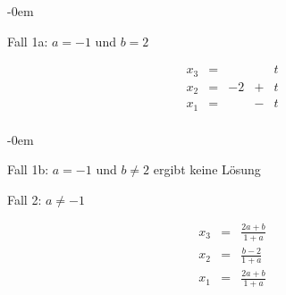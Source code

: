 \begin{enumerate}
						\abovedisplayskip-0em
						
						Fall 1a: \emph{$a = -1$} und \emph{$b = 2$} 
						
						\[
							\begin{array} {ccccc}
								x_3 & = & & & t\\
								x_2 & = & -2 & + & t\\
								x_1 & = & & - & t\\
							\end{array}
						\]
						
						\abovedisplayskip-0em
						
						Fall 1b: \emph{$a = -1$} und \emph{$b \neq 2$} ergibt keine L\"osung
						
						Fall 2: \emph{$a \neq -1$}
						
						\[
							\begin{array} {ccccc}
								x_3 & = & \frac{2a+b}{1+a}\\
								x_2 & = & \frac{b-2}{1+a}\\
								x_1 & = & \frac{2a+b}{1+a}\\
							\end{array}
						\]
						
				\end{enumerate}
